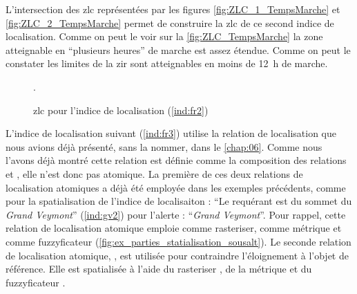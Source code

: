 L'intersection des \ac{zlc} représentées par les figures
\ref{fig:ZLC_1_TempsMarche} et \ref{fig:ZLC_2_TempsMarche} permet de
construire la \ac{zlc} de ce second indice de localisation. Comme on
peut le voir sur la \autoref{fig:ZLC_TempsMarche} la zone atteignable
en \enquote{plusieurs heures} de marche est assez étendue.
%
Comme on peut le constater les limites de la \ac{zir} sont
atteignables en moins de \SI{12}{\hour} de marche.

\begin{figure}
  \centering
  
  \caption{\ac{zlc} pour l'indice de localisation  (\ref{ind:fr2})}
  \label{fig:ZLC_TempsMarche}.  
\end{figure}


L'indice de localisation suivant (\ref{ind:fr3}) utilise la relation
de localisation  que nous avions déjà
présenté, sans la nommer, dans le \autoref{chap:06}. Comme nous
l'avons déjà montré cette relation est définie comme la composition
des relations  et ,
elle n'est donc pas atomique. La première de ces deux relations de
localisation atomiques  a déjà été employée
dans les exemples précédents, comme pour la spatialisation de l'indice
de localisaiton : \enquote{Le requérant est 
  du sommet du \emph{Grand Veymont}} (\ref{ind:gv2}) pour l'alerte :
\enquote{\emph{Grand Veymont}}. Pour rappel, cette relation de
localisation atomique emploie  comme rasteriser,
 comme métrique et
 comme fuzzyficateur
(\autoref{fig:ex_parties_statialisation_sousalt}). Le seconde relation
de localisation atomique, , est utilisée pour
contraindre l'éloignement à l'objet de référence. Elle est spatialisée
à l'aide du rasteriser , de la métrique
 et du fuzzyficateur
.

